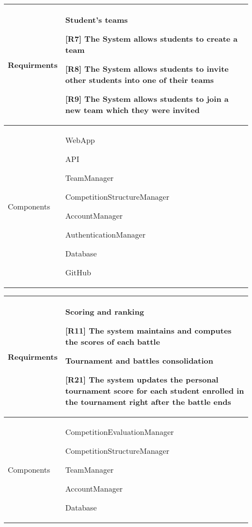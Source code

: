     \begin{table}[!h]
        \centering
        \begin{tabular}{ | m{6em} | m{30em} |} 
            \hline
             Requirments&
\textbf{Student's teams}

[R7] The System allows students to create a team
             
    [R8] The System allows students to invite other students into one of their teams
    
    [R9] The System allows students to join a new team which they were invited \\
            \hline
             Components& WebApp

             API

             TeamManager
             
             
             CompetitionStructureManager

             AccountManager
             
             AuthenticationManager
             
             Database

             GitHub\\
             \hline
        \end{tabular}
        \label{tab:my_label}
    \end{table}

    
    
    \begin{table}[!h]
        \centering
        \begin{tabular}{ | m{6em} | m{30em} |} 
            \hline
             Requirments&\textbf{Scoring and ranking}
             
             
             [R11] The system maintains and computes the scores of each battle

             \textbf{Tournament and battles consolidation}
             
             [R21] The system updates the personal tournament score for each student enrolled in the tournament right after the battle ends
    
    \\
            \hline
             Components& 
             CompetitionEvaluationManager
             
             
             CompetitionStructureManager
             
             
             TeamManager
             
             
             AccountManager
             
             Database\\
             \hline
        \end{tabular}
        \label{tab:my_label}
    \end{table}
    
